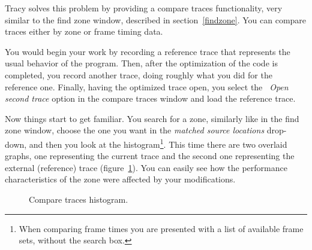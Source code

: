 \documentclass[hidelinks,titlepage,a4paper]{article}
\begin{document}
Tracy solves this problem by providing a compare traces functionality, very similar to the find zone window, described in section~\ref{findzone}. You can compare traces either by zone or frame timing data.

You would begin your work by recording a reference trace that represents the usual behavior of the program. Then, after the optimization of the code is completed, you record another trace, doing roughly what you did for the reference one. Finally, having the optimized trace open, you select the \emph{\faFolderOpen{}~Open second trace} option in the compare traces window and load the reference trace.

Now things start to get familiar. You search for a zone, similarly like in the find zone window, choose the one you want in the \emph{matched source locations} drop-down, and then you look at the histogram\footnote{When comparing frame times you are presented with a list of available frame sets, without the search box.}. This time there are two overlaid graphs, one representing the current trace and the second one representing the external (reference) trace (figure~\ref{comparehistogram}). You can easily see how the performance characteristics of the zone were affected by your modifications.

\begin{figure}[h]
\centering{}
\caption{Compare traces histogram.}
\label{comparehistogram}
\end{figure}
\end{document}
